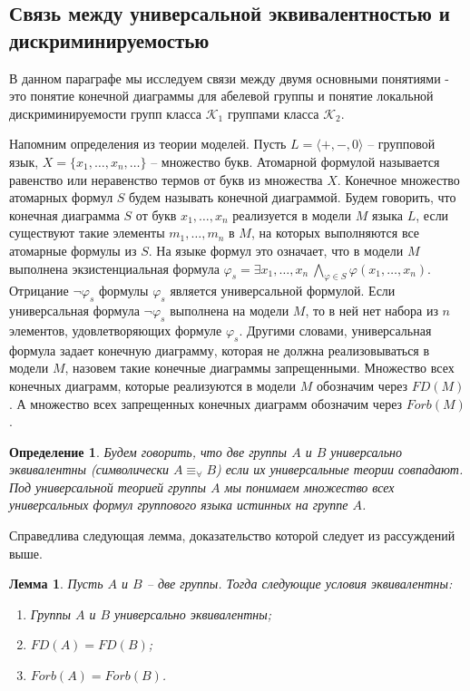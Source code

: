 \documentclass[a4paper,11pt,twoside]{article}
\newtheorem{lemma}{Лемма}[section]
\newtheorem{definition}{Определение}[section]
\def\K{{\mathcal{K}}}
\begin{document}
\subsection{Связь между универсальной эквивалентностью и дискриминируемостью}

В данном параграфе мы исследуем связи между двумя основными понятиями - это понятие конечной диаграммы для абелевой группы и понятие локальной дискриминируемости групп класса $\K_1$ группами класса $\K_2$.

Напомним определения из теории моделей. Пусть $L = \langle +, -, 0\rangle$ -- групповой язык, $X = \{x_1, \ldots, x_n, \ldots\}$ -- множество букв. Атомарной формулой называется равенство или неравенство термов от букв из множества $X$. Конечное множество атомарных формул $S$ будем называть конечной диаграммой. Будем говорить, что конечная диаграмма $S$ от букв $x_1, \ldots, x_n$ реализуется в модели $M$ языка $L$, если существуют такие элементы $m_1, \ldots, m_n$ в $M$, на которых выполняются все атомарные формулы из $S$. На языке формул это означает, что в модели $M$ выполнена экзистенциальная формула $\varphi_s = \exists x_1, \ldots, x_n \ \bigwedge\limits_{\varphi \in S} \varphi(x_1, \ldots, x_n)$. Отрицание $\neg\varphi_s$ формулы $\varphi_s$ является универсальной формулой. Если универсальная формула $\neg\varphi_s$ выполнена на модели $M$, то в ней нет набора из $n$ элементов, удовлетворяющих формуле $\varphi_s$. 
Другими словами, универсальная формула задает конечную диаграмму, которая не должна реализовываться в модели $M$, назовем такие конечные диаграммы запрещенными. Множество всех конечных диаграмм, которые реализуются в модели $M$ обозначим через $FD(M)$. А множество всех запрещенных конечных диаграмм обозначим через $Forb(M)$.

\begin{definition}
Будем говорить, что две группы $A$ и $B$ универсально эквивалентны (символически $A \equiv_\forall B$) если их универсальные теории совпадают. Под универсальной теорией группы $A$ мы понимаем множество всех универсальных формул группового языка истинных на группе $A$.
\end{definition}
Справедлива следующая лемма, доказательство которой следует из рассуждений выше.

\begin{lemma}\label{lemma:UnivEquivForb}
Пусть $A$ и $B$ -- две группы. Тогда следующие условия эквивалентны:
\begin{enumerate}
\item Группы $A$ и $B$ универсально эквивалентны;
\item $FD(A) = FD(B)$;
\item $Forb(A) = Forb(B)$.
\end{enumerate}
\end{lemma}
\end{document}
